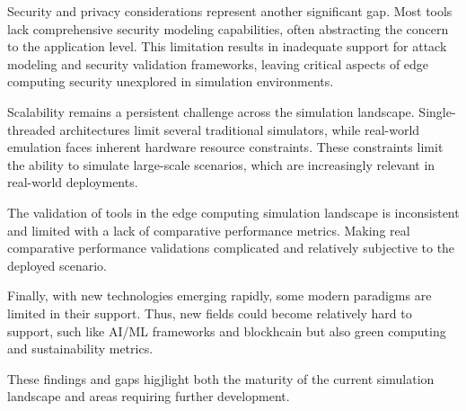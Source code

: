 Security and privacy considerations represent another significant gap.
Most tools lack comprehensive security modeling capabilities, often abstracting the concern to the application level.
This limitation results in inadequate support for attack modeling and security validation frameworks, leaving critical aspects of edge computing security unexplored in simulation environments.

Scalability remains a persistent challenge across the simulation landscape.
Single-threaded architectures limit several traditional simulators, while real-world emulation faces inherent hardware resource constraints.
These constraints limit the ability to simulate large-scale scenarios, which are increasingly relevant in real-world deployments.

The validation of tools in the edge computing simulation landscape is inconsistent and limited with a lack of comparative performance metrics.
Making real comparative performance validations complicated and relatively subjective to the deployed scenario.

Finally, with new technologies emerging rapidly, some modern paradigms are limited in their support.
Thus, new fields could become relatively hard to support, such like AI/ML frameworks and blockhcain but also green computing and sustainability metrics.

These findings and gaps higjlight both the maturity of the current simulation landscape and areas requiring further development.


